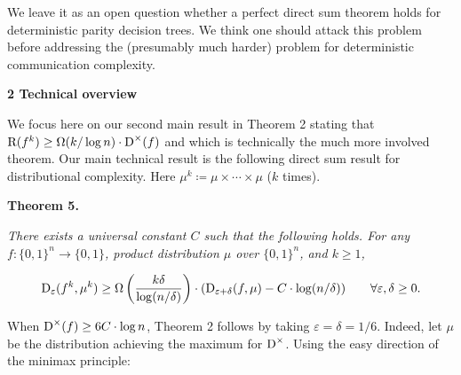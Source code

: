 


We leave it as an open question whether a perfect direct sum theorem holds for deterministic parity decision trees. We think one should attack this problem before addressing the (presumably much harder) problem for deterministic communication complexity.\par






\par\medskip\noindent\textbf{
2 Technical overview}\par




We focus here on our second main result in Theorem 2 stating that ${\textup{R}}(f^{k})\geq\Omega(k/\log n)\cdot{\textup{D}}^{\times}(f)$ and which is technically the much more involved theorem. Our main technical result is the following direct sum result for distributional complexity. Here $\mu^{k}\coloneqq\mu\times\cdots\times\mu$ ($k$ times).\par





\par\medskip\noindent\textbf{
\textbf{Theorem 5}\textbf{.}
}\par



\emph{There exists a universal constant $C$ such that the following holds.
For any $f\colon\{0,1\}^{n}\to\{0,1\}$, product distribution $\mu$ over $\{0,1\}^{n}$, and $k\geq 1$,}\par


\[\begin{gathered}
{\textup{D}}_{\varepsilon}(f^{k},\mu^{k})\geq\Omega\left(\frac{k\delta}{\log(n/\delta)}\right)\cdot({\textup{D}}_{\varepsilon+\delta}(f,\mu)-C\cdot\log(n/\delta))\qquad\forall\varepsilon,\delta\geq 0.
\end{gathered}\]






When ${\textup{D}}^{\times}(f)\geq 6C\cdot\log n$, Theorem 2 follows by taking $\varepsilon=\delta=1/6$. Indeed, let $\mu$ be the distribution achieving the maximum for ${\textup{D}}^{\times}$. Using the easy direction of the minimax principle:\par


